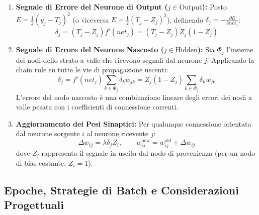 \begin{enumerate}
    \item \textbf{Segnale di Errore del Neurone di Output ($j \in \text{Output}$):}
    Posto $E = \frac{1}{2}(y_j - T_j)^2$ (o viceversa $E = \frac{1}{2}(T_j - Z_j)^2$), definendo $\delta_j = -\frac{\partial E}{\partial net_j}$:
    \begin{equation}
        \delta_j = (T_j - Z_j) f'(net_j) = (T_j - Z_j) Z_j (1 - Z_j)
        \label{eq:dm-output-delta}
    \end{equation}

    \item \textbf{Segnale di Errore del Neurone Nascosto ($j \in \text{Hidden}$):}
    Sia $\Phi_j$ l'insieme dei nodi dello strato a valle che ricevono segnali dal neurone $j$. Applicando la chain rule su tutte le vie di propagazione uscenti:
    \begin{equation}
        \delta_j = f'(net_j) \sum_{k \in \Phi_j} \delta_k w_{jk} = Z_j (1 - Z_j) \sum_{k \in \Phi_j} \delta_k w_{jk}
        \label{eq:dm-hidden-delta}
    \end{equation}
    L'errore del nodo nascosto è una combinazione lineare degli errori dei nodi a valle pesata con i coefficienti di connessione correnti.

    \item \textbf{Aggiornamento dei Pesi Sinaptici:}
    Per qualunque connessione orientata dal neurone sorgente $i$ al neurone ricevente $j$:
    \begin{equation}
        \Delta w_{ij} = \lambda \delta_j Z_i, \qquad w_{ij}^{\text{new}} = w_{ij}^{\text{old}} + \Delta w_{ij}
        \label{eq:dm-weight-update-general}
    \end{equation}
    dove $Z_i$ rappresenta il segnale in uscita dal nodo di provenienza (per un nodo di bias costante, $Z_i = 1$).
\end{enumerate}

\FloatBarrier
\subsection{Epoche, Strategie di Batch e Considerazioni Progettuali}
\label{subsec:dm-training-regimes}

